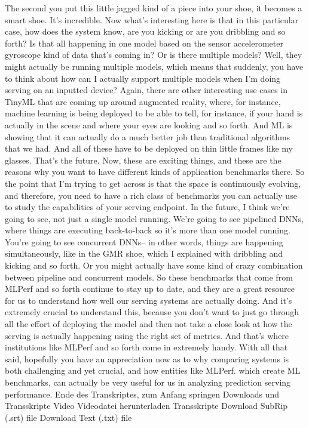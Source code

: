 {{{{{{{    The second you put this little jagged kind of a piece into your shoe,
    it becomes a smart shoe.
    It's incredible.
    Now what's interesting here is that in this particular case,
    how does the system know, are you kicking
    or are you dribbling and so forth?
    Is that all happening in one model based on the sensor accelerometer gyroscope
    kind of data that's coming in?
    Or is there multiple models?
    Well, they might actually be running multiple models, which
    means that suddenly, you have to think about
    how can I actually support multiple models when I'm
    doing serving on an inputted device?
    Again, there are other interesting use cases in TinyML
    that are coming up around augmented reality,
    where, for instance, machine learning is being deployed
    to be able to tell, for instance, if your hand is actually in the scene
    and where your eyes are looking and so forth.
    And ML is showing that it can actually do
    a much better job than traditional algorithms that we had.
    And all of these have to be deployed on thin little frames like my glasses.
    That's the future.
    Now, these are exciting things, and these
    are the reasons why you want to have different kinds of application
    benchmarks there.
    So the point that I'm trying to get across
    is that the space is continuously evolving,
    and therefore, you need to have a rich class of benchmarks
    you can actually use to study the capabilities of your serving endpoint.
    In the future, I think we're going to see, not just a single model running.
    We're going to see pipelined DNNs, where things are executing back-to-back
    so it's more than one model running.
    You're going to see concurrent DNNs--
    in other words, things are happening simultaneously,
    like in the GMR shoe, which I explained with dribbling and kicking
    and so forth.
    Or you might actually have some kind of crazy combination between pipeline
    and concurrent models.
    So these benchmarks that come from MLPerf
    and so forth continue to stay up to date,
    and they are a great resource for us to understand how well our serving systems
    are actually doing.
    And it's extremely crucial to understand this,
    because you don't want to just go through all the effort of deploying
    the model and then not take a close look at how the serving is actually
    happening using the right set of metrics.
    And that's where institutions like MLPerf and so forth come
    in extremely handy.
    With all that said, hopefully you have an appreciation now
    as to why comparing systems is both challenging and yet crucial,
    and how entities like MLPerf. which create ML benchmarks,
    can actually be very useful for us in analyzing prediction
    serving performance.
    Ende des Transkriptes, zum Anfang springen
    Downloads und Transskripte
    Video
    Videodatei herunterladen
    Transskripte
    Download SubRip (.srt) file
    Download Text (.txt) file  
    
}}}}}}}
